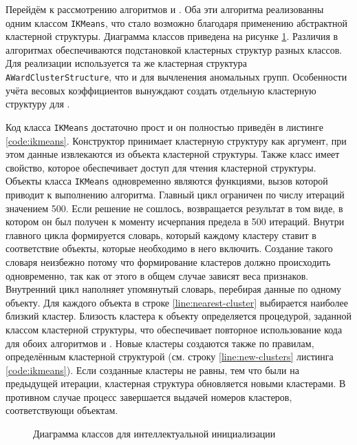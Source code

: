 \documentclass[12pt]{diploma}
\begin{document}
	Перейдём к рассмотрению алгоритмов \ikmeans и \imwkmeanspb. Оба эти алгоритма реализованны одним классом \texttt{IKMeans}, что стало возможно благодаря применению абстрактной кластерной структуры. Диаграмма классов приведена на рисунке \ref{fig:imwkmeans-classes}. Различия в алгоритмах обеспечиваются подстановкой кластерных структур разных классов. Для реализации \ikmeans используется та же кластерная структура \texttt{AWardClusterStructure}, что и для вычленения аномальных групп. Особенности учёта весовых коэффициентов вынуждают создать отдельную кластерную структуру для \imwkmeanspb. 
	
	Код класса \texttt{IKMeans} достаточно прост и он полностью приведён в листинге \ref{code:ikmeans}. Конструктор принимает кластерную структуру как аргумент, при этом данные извлекаются из объекта кластерной структуры. Также класс имеет свойство, которое обеспечивает доступ для чтения кластерной структуры. Объекты класса \texttt{IKMeans} одновременно являются функциями, вызов которой приводит к выполнению алгоритма. Главный цикл ограничен по числу итераций значением 500. Если решение не сошлось, возвращается результат в том виде, в котором он был получен к моменту исчерпания предела в 500 итераций. Внутри главного цикла формируется словарь, который каждому кластеру ставит в соответствие объекты, которые необходимо в него включить. Создание такого словаря неизбежно потому что формирование кластеров должно происходить одновременно, так как от этого в общем случае зависят веса признаков. Внутренний цикл наполняет упомянутый словарь, перебирая данные по одному объекту. Для каждого объекта в строке \ref{line:nearest-cluster} выбирается наиболее близкий кластер. Близость кластера к объекту определяется процедурой, заданной классом кластерной структуры, что обеспечивает повторное использование кода для обоих алгоритмов \AWard и \AWardpb. Новые кластеры создаются также по правилам, определённым кластерной структурой (см. строку \ref{line:new-clusters} листинга \ref{code:ikmeans}). Если созданные кластеры не равны, тем что были на предыдущей итерации, кластерная структура обновляется новыми кластерами. В противном случае процесс завершается выдачей номеров кластеров, соответствующи объектам.
	
		
	\begin{figure}[h!]
		\centering
		
		\caption{Диаграмма классов для интеллектуальной инициализации}
		\label{fig:imwkmeans-classes}
	\end{figure}
	
\end{document}
